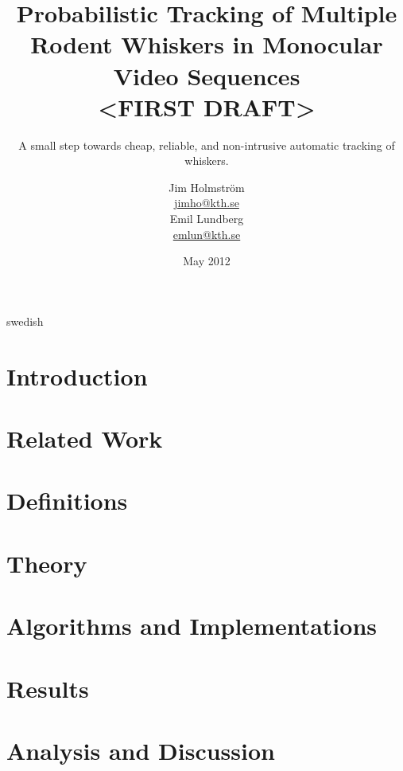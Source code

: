 \documentclass[a4paper,11pt]{kth-mag}
\title{
    Probabilistic Tracking of Multiple Rodent Whiskers in Monocular Video
    Sequences\\ <FIRST DRAFT>
}
\subtitle{
    A small step towards cheap, reliable, and non-intrusive automatic tracking of whiskers.
}
\author{
    Jim Holmström\\
    \href{mailto:jimho@kth.se}{jimho@kth.se}\\
    Emil Lundberg\\
    \href{mailto:emlun@kth.se}{emlun@kth.se}
}
\date{May 2012}
\theoremstyle{definition}
\begin{document}
\frontmatter
\pagestyle{empty}
\removepagenumbers
\maketitle
{}
\begin{abstract}
    
\end{abstract}
\clearpage
\begin{foreignabstract}{swedish}
    
\end{foreignabstract}
\clearpage
\tableofcontents*
\mainmatter
\pagestyle{newchap}
\chapter{Introduction}
    \label{sec:introduction}
    

\chapter{Related Work}
    \label{sec:related_work}
    

\chapter{Definitions}
    \label{sec:definitions}
    

\chapter{Theory}
    \label{sec:theory}
    

\chapter{Algorithms and Implementations}
    \label{sec:algorithms_implementations}
    


\chapter{Results}
    \label{sec:benchmarks_results}
    

\chapter{Analysis and Discussion}
    \label{sec:analysis_discussion}
    
\end{document}

